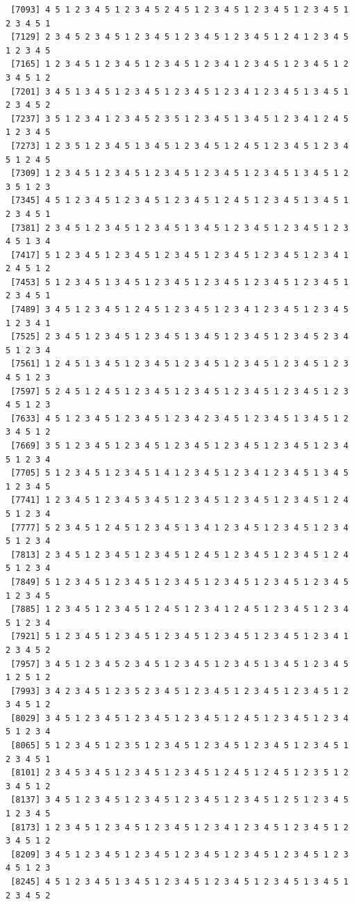\documentclass[
  english,
]{book}
\begin{document}
\begin{verbatim}
 [7093] 4 5 1 2 3 4 5 1 2 3 4 5 2 4 5 1 2 3 4 5 1 2 3 4 5 1 2 3 4 5 1 2 3 4 5 1
 [7129] 2 3 4 5 2 3 4 5 1 2 3 4 5 1 2 3 4 5 1 2 3 4 5 1 2 4 1 2 3 4 5 1 2 3 4 5
 [7165] 1 2 3 4 5 1 2 3 4 5 1 2 3 4 5 1 2 3 4 1 2 3 4 5 1 2 3 4 5 1 2 3 4 5 1 2
 [7201] 3 4 5 1 3 4 5 1 2 3 4 5 1 2 3 4 5 1 2 3 4 1 2 3 4 5 1 3 4 5 1 2 3 4 5 2
 [7237] 3 5 1 2 3 4 1 2 3 4 5 2 3 5 1 2 3 4 5 1 3 4 5 1 2 3 4 1 2 4 5 1 2 3 4 5
 [7273] 1 2 3 5 1 2 3 4 5 1 3 4 5 1 2 3 4 5 1 2 4 5 1 2 3 4 5 1 2 3 4 5 1 2 4 5
 [7309] 1 2 3 4 5 1 2 3 4 5 1 2 3 4 5 1 2 3 4 5 1 2 3 4 5 1 3 4 5 1 2 3 5 1 2 3
 [7345] 4 5 1 2 3 4 5 1 2 3 4 5 1 2 3 4 5 1 2 4 5 1 2 3 4 5 1 3 4 5 1 2 3 4 5 1
 [7381] 2 3 4 5 1 2 3 4 5 1 2 3 4 5 1 3 4 5 1 2 3 4 5 1 2 3 4 5 1 2 3 4 5 1 3 4
 [7417] 5 1 2 3 4 5 1 2 3 4 5 1 2 3 4 5 1 2 3 4 5 1 2 3 4 5 1 2 3 4 1 2 4 5 1 2
 [7453] 5 1 2 3 4 5 1 3 4 5 1 2 3 4 5 1 2 3 4 5 1 2 3 4 5 1 2 3 4 5 1 2 3 4 5 1
 [7489] 3 4 5 1 2 3 4 5 1 2 4 5 1 2 3 4 5 1 2 3 4 1 2 3 4 5 1 2 3 4 5 1 2 3 4 1
 [7525] 2 3 4 5 1 2 3 4 5 1 2 3 4 5 1 3 4 5 1 2 3 4 5 1 2 3 4 5 2 3 4 5 1 2 3 4
 [7561] 1 2 4 5 1 3 4 5 1 2 3 4 5 1 2 3 4 5 1 2 3 4 5 1 2 3 4 5 1 2 3 4 5 1 2 3
 [7597] 5 2 4 5 1 2 4 5 1 2 3 4 5 1 2 3 4 5 1 2 3 4 5 1 2 3 4 5 1 2 3 4 5 1 2 3
 [7633] 4 5 1 2 3 4 5 1 2 3 4 5 1 2 3 4 2 3 4 5 1 2 3 4 5 1 3 4 5 1 2 3 4 5 1 2
 [7669] 3 5 1 2 3 4 5 1 2 3 4 5 1 2 3 4 5 1 2 3 4 5 1 2 3 4 5 1 2 3 4 5 1 2 3 4
 [7705] 5 1 2 3 4 5 1 2 3 4 5 1 4 1 2 3 4 5 1 2 3 4 1 2 3 4 5 1 3 4 5 1 2 3 4 5
 [7741] 1 2 3 4 5 1 2 3 4 5 3 4 5 1 2 3 4 5 1 2 3 4 5 1 2 3 4 5 1 2 4 5 1 2 3 4
 [7777] 5 2 3 4 5 1 2 4 5 1 2 3 4 5 1 3 4 1 2 3 4 5 1 2 3 4 5 1 2 3 4 5 1 2 3 4
 [7813] 2 3 4 5 1 2 3 4 5 1 2 3 4 5 1 2 4 5 1 2 3 4 5 1 2 3 4 5 1 2 4 5 1 2 3 4
 [7849] 5 1 2 3 4 5 1 2 3 4 5 1 2 3 4 5 1 2 3 4 5 1 2 3 4 5 1 2 3 4 5 1 2 3 4 5
 [7885] 1 2 3 4 5 1 2 3 4 5 1 2 4 5 1 2 3 4 1 2 4 5 1 2 3 4 5 1 2 3 4 5 1 2 3 4
 [7921] 5 1 2 3 4 5 1 2 3 4 5 1 2 3 4 5 1 2 3 4 5 1 2 3 4 5 1 2 3 4 1 2 3 4 5 2
 [7957] 3 4 5 1 2 3 4 5 2 3 4 5 1 2 3 4 5 1 2 3 4 5 1 3 4 5 1 2 3 4 5 1 2 5 1 2
 [7993] 3 4 2 3 4 5 1 2 3 5 2 3 4 5 1 2 3 4 5 1 2 3 4 5 1 2 3 4 5 1 2 3 4 5 1 2
 [8029] 3 4 5 1 2 3 4 5 1 2 3 4 5 1 2 3 4 5 1 2 4 5 1 2 3 4 5 1 2 3 4 5 1 2 3 4
 [8065] 5 1 2 3 4 5 1 2 3 5 1 2 3 4 5 1 2 3 4 5 1 2 3 4 5 1 2 3 4 5 1 2 3 4 5 1
 [8101] 2 3 4 5 3 4 5 1 2 3 4 5 1 2 3 4 5 1 2 4 5 1 2 4 5 1 2 3 5 1 2 3 4 5 1 2
 [8137] 3 4 5 1 2 3 4 5 1 2 3 4 5 1 2 3 4 5 1 2 3 4 5 1 2 5 1 2 3 4 5 1 2 3 4 5
 [8173] 1 2 3 4 5 1 2 3 4 5 1 2 3 4 5 1 2 3 4 1 2 3 4 5 1 2 3 4 5 1 2 3 4 5 1 2
 [8209] 3 4 5 1 2 3 4 5 1 2 3 4 5 1 2 3 4 5 1 2 3 4 5 1 2 3 4 5 1 2 3 4 5 1 2 3
 [8245] 4 5 1 2 3 4 5 1 3 4 5 1 2 3 4 5 1 2 3 4 5 1 2 3 4 5 1 3 4 5 1 2 3 4 5 2

\end{verbatim}
\end{document}
